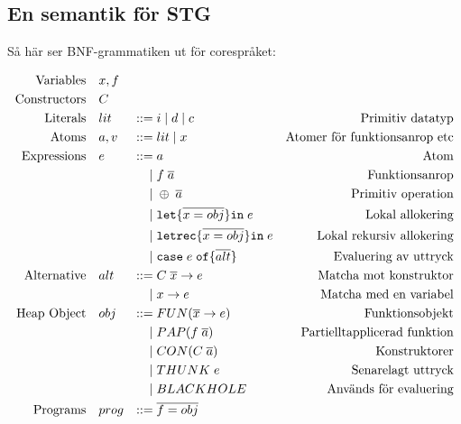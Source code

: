 \documentclass[../Core]{subfiles}
\begin{document}
\subsection{En semantik för STG}






Så här ser BNF-grammatiken ut för corespråket:


\begin{equation*}
\begin{aligned}
\text{Variables} \quad & x,f \\
\text{Constructors} \quad & C \\
\text{Literals}\quad&lit&::=&\;i \; | \;  d \;|\; c&\text{Primitiv datatyp} \\
\text{Atoms}\quad&a, v&::=&\;lit \; | \; x&\text{Atomer för funktionsanrop etc} \\
\text{Expressions}\quad&e&::=&\;a&\text{Atom} \\
    &&|&\;f \; \overline{a}&\text{Funktionsanrop} \\
    &&|&\;\oplus \; \overline{a}&\text{Primitiv operation} \\
    &&|&\;\mathtt{let \{} \overline{x = obj} \mathtt{ \} in } \; e&\text{Lokal allokering} \\
    &&|&\;\mathtt{letrec \{} \overline{x = obj} \mathtt{ \} in } \; e&\text{Lokal rekursiv allokering} \\
    &&|&\;\mathtt{case} \; e \;  \mathtt{ of \{ } \overline{alt} \mathtt{\}}&\text{Evaluering av uttryck} \\
\text{Alternative}\quad&alt&::=&\;C \; \overline{x} \rightarrow e&\text{Matcha mot konstruktor} \\
    &&|&\;x \rightarrow e&\text{Matcha med en variabel} \\
\text{Heap Object}\quad&obj&::=&\;FUN(\overline{x} \rightarrow e)&\text{Funktionsobjekt} \\
    &&|&\;PAP(f \; \overline{a})&\text{Partielltapplicerad funktion} \\
    &&|&\;CON(C \; \overline{a})&\text{Konstruktorer} \\
    &&|&\;THUNK \; e&\text{Senarelagt uttryck} \\
    &&|&\;BLACKHOLE&\text{Används för evaluering} \\
\text{Programs}\quad&prog&::=&\;\overline{f=obj}&\text{}
\end{aligned}
\end{equation*}
\end{document}
